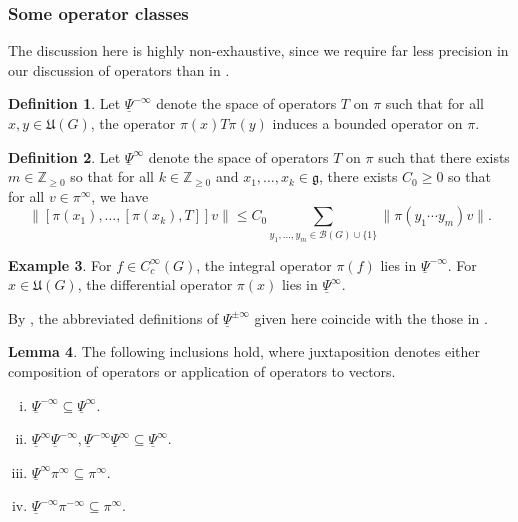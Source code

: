 \documentclass[reqno]{amsart}
\theoremstyle{plain} \newtheorem{theorem} {Theorem}
\theoremstyle{definition} \newtheorem{definition} [theorem] {Definition}
\newtheorem{example} [theorem] {Example}
\theoremstyle{itplain} %
\newtheorem{lemma}[theorem]{Lemma}
\numberwithin{equation}{section}
\numberwithin{theorem}{section}
\renewcommand{\geq}{\geqslant}
\renewcommand{\leq}{\leqslant}
\begin{document}
\subsubsection{Some operator classes}\label{sec:negligible-operators}
The discussion here is highly non-exhaustive, since we require far less precision in our discussion of operators than in \cite{nelson-venkatesh-1, 2020arXiv201202187N}.
\begin{definition}
  Let $\underline{\Psi }^{-\infty}$ denote the space of operators $T$ on $\pi$ such that for all $x,y \in \mathfrak{U}(G)$, the operator $\pi(x) T \pi(y)$ induces a bounded operator on $\pi$.
\end{definition}
\begin{definition}
  Let $\underline{\Psi }^{\infty}$ denote the space  of operators $T$ on $\pi$ such that there exists $m \in \mathbb{Z}_{\geq 0}$ so that for all $k \in \mathbb{Z}_{\geq 0}$ and $x_1,\dotsc,x_k \in \mathfrak{g}$, there exists $C_0 \geq 0$ so that for all $v \in \pi^\infty$, we have
\begin{equation*}
  \|[\pi(x_1), \dotsc, [\pi(x_k), T] ] v\| \leq C_0 \sum_{y_1,\dotsc,y_m \in \mathcal{B}(G) \cup \{1\}} \|\pi(y_1 \dotsb y_m) v\|.
\end{equation*}
\end{definition}
\begin{example}
  For $f \in C_c^\infty(G)$, the integral operator $\pi(f)$ lies in $\underline{\Psi }^{-\infty}$.  For $x \in \mathfrak{U}(G)$, the differential operator $\pi(x)$ lies in $\underline{\Psi }^{\infty}$.
\end{example}
\begin{remark}
  By \cite[(3.1), Lem 3.5, Prop 8.2]{nelson-venkatesh-1}, the abbreviated definitions of $\underline{\Psi }^{\pm \infty}$ given here coincide with the those in \cite[\S10]{2020arXiv201202187N}.
\end{remark}
\begin{lemma}\label{lem:foll-incl-hold}
  The following inclusions hold, where juxtaposition denotes either composition of operators or application of operators to vectors.
  \begin{enumerate}[(i)]
  \item $\underline{\Psi}^{-\infty} \subseteq \underline{\Psi}^{\infty}$.
  \item $\underline{\Psi}^{\infty} \underline{\Psi}^{-\infty}, \underline{\Psi}^{-\infty} \underline{\Psi}^{\infty} \subseteq \underline{\Psi}^{\infty}$.
  \item $\underline{\Psi }^{\infty} \pi^\infty \subseteq \pi^\infty$.
  \item $\underline{\Psi }^{-\infty} \pi^{-\infty} \subseteq \pi^\infty$.
  \end{enumerate}
\end{lemma}
\end{document}
